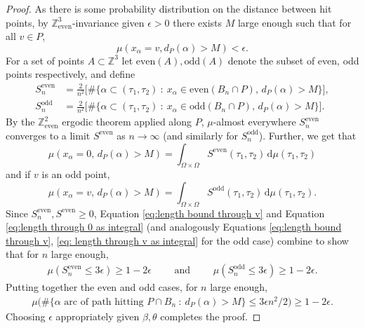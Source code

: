 \documentclass[11pt]{article}
\theoremstyle{remark}
\theoremstyle{definition}
\newcommand{\Z}{\mathbb{Z}}
\newcommand{\threeeven}{\Z^3_{\text{even}}}
\newcommand{\m}[1]{\mathbb{#1}}
\newcommand{\dd}{\mathrm{d}}
\begin{document}
\begin{proof}
As there is some probability distribution on the distance between hit points, by $\threeeven$-invariance given $\epsilon>0$ there exists $M$ large enough such that for all $v\in P$,
\begin{equation}\label{eq:length bound through v}
    \mu(x_\alpha = v, d_P(\alpha) > M) < \epsilon.
\end{equation}
For a set of points $A\subset \m Z^3$ let $\text{even}(A), \text{odd}(A)$ denote the subset of even, odd points respectively, and define 
\begin{align*}
    S_n^{\text{even}} &= \frac{2}{n^2}\bigg[\# \{\alpha\subset (\tau_1,\tau_2) ~:~ x_\alpha\in \text{even}(B_n\cap P),\, d_P(\alpha)>M\}\bigg],\\
    S_n^{\text{odd}} &= \frac{2}{n^2}\bigg[\# \{\alpha\subset (\tau_1,\tau_2) ~:~ x_\alpha\in \text{odd}(B_n\cap P),\, d_P(\alpha)>M\}\bigg].
\end{align*}
By the $\m Z_{\text{even}}^2$ ergodic theorem applied along $P$, $\mu$-almost everywhere $S_n^{\text{even}}$ converges to a limit $S^{\text{even}}$ as $n\to \infty$ (and similarly for $S_n^{\text{odd}}$). Further, we get that 
\begin{equation}\label{eq:length through 0 as integral}
        \mu(x_\alpha=0,\, d_P(\alpha)>M) =  \int_{\Omega\times \Omega} S^{\text{even}}(\tau_1,\tau_2)\, \dd \mu(\tau_1,\tau_2)
\end{equation}
and if $v$ is an odd point,
\begin{equation}\label{eq: length through v as integral}
     \mu(x_\alpha=v,\, d_P(\alpha)>M)=\int_{\Omega\times \Omega} S^{\text{odd}}(\tau_1,\tau_2)\, \dd \mu(\tau_1,\tau_2).
\end{equation}
Since $S_n^{\text{even}},S^{\text{even}}\geq 0$, Equation \eqref{eq:length bound through v} and Equation \eqref{eq:length through 0 as integral} (and analogously Equations \eqref{eq:length bound through v}, \eqref{eq: length through v as integral} for the odd case) combine to show that for $n$ large enough,
\begin{align*}
    \mu(S_n^{\text{even}} \leq 3 \epsilon) \geq 1-2\epsilon\qquad \text{ and } \qquad \mu(S_n^{\text{odd}} \leq 3 \epsilon) \geq 1-2\epsilon.
\end{align*}
Putting together the even and odd cases, for $n$ large enough,
\begin{align*}
      \mu\bigg(\#\{ \alpha \text{ arc of path hitting }P\cap B_n ~:~ d_P(\alpha)>M\} \leq 3\epsilon n^2/2\bigg) \geq 1-2\epsilon.
\end{align*}
Choosing $\epsilon$ appropriately given $\beta,\theta$ completes the proof.
\end{proof}
\end{document}

